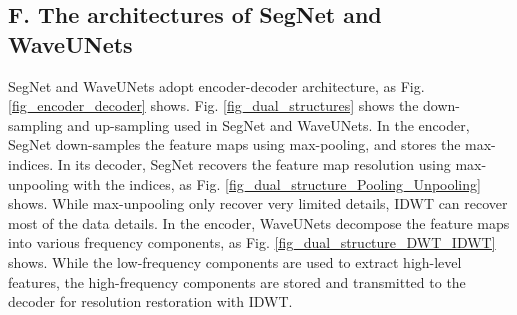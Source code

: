 \subsection*{F. The architectures of SegNet and WaveUNets}
SegNet and WaveUNets adopt encoder-decoder architecture, as Fig. \ref{fig_encoder_decoder} shows.
Fig. \ref{fig_dual_structures} shows the down-sampling and up-sampling used in SegNet and WaveUNets.
In the encoder, SegNet down-samples the feature maps using max-pooling, and stores the max-indices.
In its decoder, SegNet recovers the feature map resolution using max-unpooling with the indices,
as Fig. \ref{fig_dual_structure_Pooling_Unpooling} shows.
While max-unpooling only recover very limited details, IDWT can recover most of the data details.
In the encoder, WaveUNets decompose the feature maps into various frequency components, as Fig. \ref{fig_dual_structure_DWT_IDWT} shows.
While the low-frequency components are used to extract high-level features,
the high-frequency components are stored and transmitted to the decoder for resolution restoration with IDWT.

